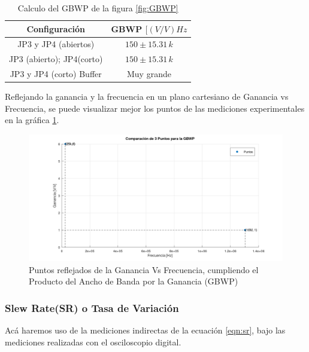         \begin{table}[H]
          \centering
          \begin{tabular}{|c|c|}
            \hline
            \textbf{Configuración} & \textbf{GBWP} $[(V/V)Hz$ \\
            \hline
            JP3 y JP4 (abiertos) & $150\pm 15.31 \, k$ \\
            \hline
            JP3 (abierto); JP4(corto) & $150 \pm  15.31 \, k$ \\
            \hline
            JP3 y JP4 (corto) Buffer & Muy grande \\
            \hline
          \end{tabular}
          \caption{Calculo del GBWP de la figura \ref{fig:GBWP}}
          \label{tab:calculo_gbwp}
        \end{table}
        Reflejando la ganancia y la frecuencia en un plano cartesiano de Ganancia vs Frecuencia, se puede visualizar mejor los puntos de las mediciones experimentales en la gráfica \ref{fig:puntos_gbwp}.

        \begin{figure}[H]
            \centering
            \renewcommand{\figurename}{Gráfica}
            \setcounter{figure}{36}
            \includegraphics[width=15cm]{Imagenes/puntos_gbwp.png}
            \caption{Puntos reflejados de la Ganancia Vs Frecuencia, cumpliendo el Producto  del Ancho de Banda por la Ganancia (GBWP)}
            \label{fig:puntos_gbwp}
        \end{figure}

    \subsubsection{Slew Rate(SR) o Tasa de Variación}

        Acá haremos uso de la mediciones indirectas de la ecuación \ref{eqn:sr}, bajo las mediciones realizadas con el osciloscopio digital.
        
